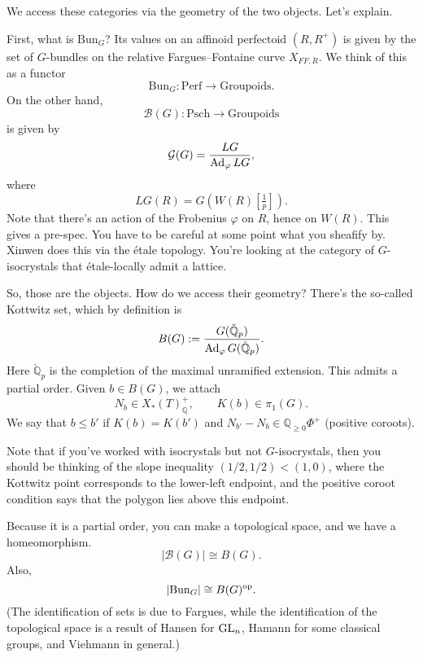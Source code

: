 \documentclass[reqno]{amsart} 
\begin{document}
We access these categories via the geometry of the two objects.  Let's explain.

First, what is $\mathrm{Bun}_G$?  Its values on an affinoid perfectoid $(R, R^+)$ is given by the set of $G$-bundles on the relative Fargues--Fontaine curve $X_{F F, R}$.  We think of this as a functor
\begin{equation*}
  \mathrm{Bun}_G : \mathrm{Perf} \rightarrow \mathrm{Groupoids}.
\end{equation*}
On the other hand,
\begin{equation*}
  \mathcal{B}(G) : \mathrm{Psch} \rightarrow \mathrm{Groupoids}
\end{equation*}
is given by
\begin{equation*}
  \mathcal{G}(G) = \frac{L G}{\operatorname{Ad}_\varphi L G},
\end{equation*}
where
\begin{equation*}
  L G(R) = G \left( W(R)[\tfrac{1}{p}] \right).
\end{equation*}
Note that there's an action of the Frobenius $\varphi$ on $R$, hence on $W(R)$.  This gives a pre-spec.  You have to be careful at some point what you sheafify by.  Xinwen does this via the {\'e}tale topology.  You're looking at the category of $G$-isocrystals that {\'e}tale-locally admit a lattice.

So, those are the objects.  How do we access their geometry?  There's the so-called Kottwitz set, which by definition is
\begin{equation*}
  B(G) :=
  \frac{G(\check{\mathbb{Q}}_p)}{\operatorname{Ad}_{\varphi} G(\check{\mathbb{Q}}_p)}.
\end{equation*}
Here $\check{\mathbb{Q}}_p$ is the completion of the maximal unramified extension.  This admits a partial order.  Given $b \in B(G)$, we attach
\begin{equation*}
  N_b \in X_\ast(T)^+_{\mathbb{Q}},
  \qquad
  K(b) \in \pi_1(G).
\end{equation*}
We say that $b \leq b '$ if $K(b) = K(b')$ and $N_{b '} - N_b \in \mathbb{Q}_{\geq 0} \Phi^+$ (positive coroots).

Note that if you've worked with isocrystals but not $G$-isocrystals, then you should be thinking of the slope inequality $(1/2, 1/2) <(1, 0)$, where the Kottwitz point corresponds to the lower-left endpoint, and the positive coroot condition says that the polygon lies above this endpoint.

Because it is a partial order, you can make a topological space, and we have a homeomorphism.
\begin{equation*}
  \lvert \mathcal{B}(G) \rvert \cong B(G).
\end{equation*}
Also,
\begin{equation*}
  \lvert \mathrm{Bun}_G \rvert \cong B(G)^{\operatorname{op}}.
\end{equation*}
(The identification of sets is due to Fargues, while the identification of the topological space is a result of Hansen for $\operatorname{GL}_n$, Hamann for some classical groups, and Viehmann in general.)
\end{document}
